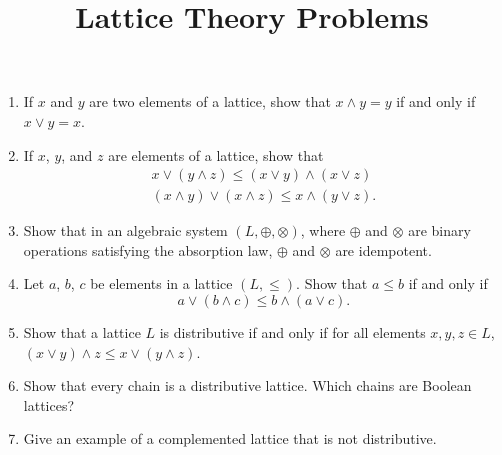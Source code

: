 \documentclass[svgnames]{amsart}
\title{Lattice Theory Problems}
\date{}
\begin{document}
\maketitle
\begin{enumerate}[leftmargin=*]
\item If $x$ and $y$ are two elements of a lattice, show that $x \wedge y = y$ if and only if $x \vee y = x$.

\item If $x$, $y$, and $z$ are elements of a lattice, show that
\begin{align*}
x \vee (y \wedge z) \le (x \vee y) \wedge (x \vee z) \\
(x \wedge y) \vee (x \wedge z) \le x \wedge (y \vee z).
\end{align*}

\item Show that in an algebraic system $(L, \oplus, \otimes)$, where $\oplus$ and $\otimes$ are binary operations satisfying the absorption law, $\oplus$ and $\otimes$ are idempotent.

\item Let $a$, $b$, $c$ be elements in a lattice $(L, \le)$. Show that $a \le b$ if and only if
\begin{equation*}
a \vee (b \wedge c) \le b \wedge (a \vee c).
\end{equation*}

\item Show that a lattice $L$ is distributive if and only if for all elements $x, y, z \in L$, $(x \vee y) \wedge z \le x \vee (y \wedge z)$.

\item Show that every chain is a distributive lattice. Which chains are Boolean lattices?

\item Give an example of a complemented lattice that is not distributive.
\end{enumerate}
\end{document}
